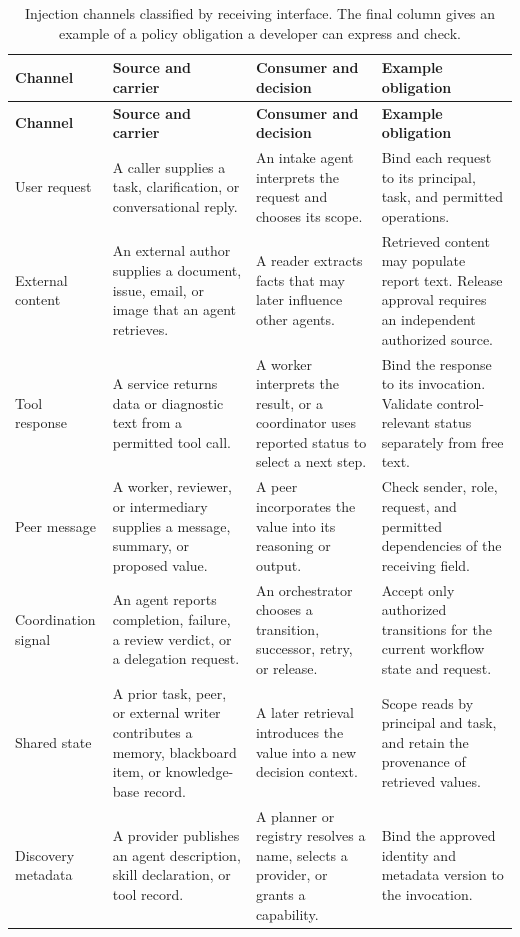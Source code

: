 \documentclass[11pt]{article}
\begin{document}
\begin{longtable}{@{}p{.16\linewidth}@{\hspace{.02\linewidth}}p{.25\linewidth}@{\hspace{.02\linewidth}}p{.27\linewidth}@{\hspace{.02\linewidth}}p{.25\linewidth}@{}}
\caption{Injection channels classified by receiving interface. The final column gives an example of a policy obligation a developer can express and check.}\label{tab:channels-inert}\\
\hline\textbf{Channel} & \textbf{Source and carrier} & \textbf{Consumer and decision} & \textbf{Example obligation}\\\hline\endfirsthead
\hline\textbf{Channel} & \textbf{Source and carrier} & \textbf{Consumer and decision} & \textbf{Example obligation}\\\hline\endhead
User request & A caller supplies a task, clarification, or conversational reply. & An intake agent interprets the request and chooses its scope. & Bind each request to its principal, task, and permitted operations.\\[3pt]
External content & An external author supplies a document, issue, email, or image that an agent retrieves. & A reader extracts facts that may later influence other agents. & Retrieved content may populate report text. Release approval requires an independent authorized source.\\[3pt]
Tool response & A service returns data or diagnostic text from a permitted tool call. & A worker interprets the result, or a coordinator uses reported status to select a next step. & Bind the response to its invocation. Validate control-relevant status separately from free text.\\[3pt]
Peer message & A worker, reviewer, or intermediary supplies a message, summary, or proposed value. & A peer incorporates the value into its reasoning or output. & Check sender, role, request, and permitted dependencies of the receiving field.\\[3pt]
Coordination signal & An agent reports completion, failure, a review verdict, or a delegation request. & An orchestrator chooses a transition, successor, retry, or release. & Accept only authorized transitions for the current workflow state and request.\\[3pt]
Shared state & A prior task, peer, or external writer contributes a memory, blackboard item, or knowledge-base record. & A later retrieval introduces the value into a new decision context. & Scope reads by principal and task, and retain the provenance of retrieved values.\\[3pt]
Discovery metadata & A provider publishes an agent description, skill declaration, or tool record. & A planner or registry resolves a name, selects a provider, or grants a capability. & Bind the approved identity and metadata version to the invocation.\\\hline
\end{longtable}
\end{document}
